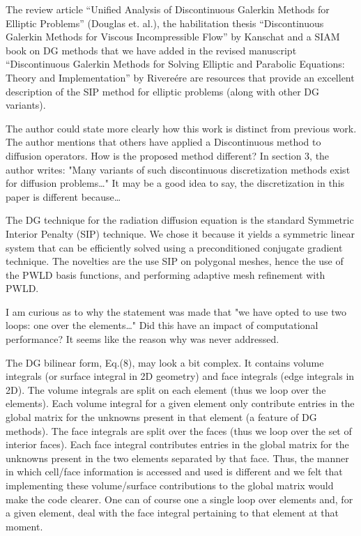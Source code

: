 \documentclass{article}
\begin{document}
The review article ``Unified Analysis of Discontinuous Galerkin Methods for Elliptic Problems'' (Douglas et. al.),
the habilitation thesis ``Discontinuous Galerkin Methods for Viscous Incompressible Flow'' by Kanschat and a SIAM book on DG 
methods that we have added in the revised manuscript ``Discontinuous Galerkin Methods for Solving Elliptic and Parabolic Equations: Theory and Implementation'' by Rivere\'ere are resources that provide an excellent description of the SIP method for elliptic problems (along with other DG variants). 
\bigskip

{
\color{blue}
The author could state more clearly how this work is distinct from previous work. The author mentions
that others have applied a Discontinuous method to diffusion operators. How is the proposed method
different? In section 3, the author writes: "Many variants of such discontinuous discretization methods
exist for diffusion problems…" It may be a good idea to say, the discretization in this paper is different
because…
}

The DG technique for the radiation diffusion equation is the standard Symmetric Interior Penalty (SIP) technique. 
We chose it because it yields a symmetric linear system that can be efficiently solved using
a preconditioned conjugate gradient technique. The novelties are the use SIP on polygonal meshes, hence the use of the PWLD basis functions,
and performing adaptive mesh refinement with PWLD.

\bigskip

{
\color{blue}
I am curious as to why the statement was made that "we have opted to use two loops: one over the
elements…" Did this have an impact of computational performance? It seems like the reason why was never
addressed.
}

The DG bilinear form, Eq.(8), may look a bit complex. It contains volume integrals (or surface integral in 2D geometry)
and face integrals (edge integrals in 2D). The volume integrals are split on each element (thus we loop over the elements). 
Each volume integral for a given element only contribute entries in the global matrix for the unknowns present 
in that element (a feature of DG methods). The face integrals are split over the faces (thus we loop over the set of interior faces). 
Each face integral contributes entries in the global matrix for the  unknowns present in the two elements separated by that face. 
Thus, the manner in which cell/face information is accessed and used is different and we felt that implementing these volume/surface contributions
to the global matrix would make the code clearer. One can of course one a single loop over elements and, for a given element, deal 
with the face integral pertaining to that element at that moment.
\end{document}
